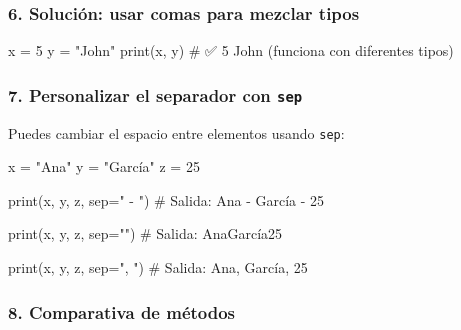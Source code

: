 \documentclass[
  doc,
  floatsintext,
  longtable,
  a4paper,
  nolmodern,
  notxfonts,
  notimes,
  12pt,
  colorlinks=true,linkcolor=blue,citecolor=blue,urlcolor=blue]{apa7}
\newenvironment{Shaded}{\begin{snugshade}}{\end{snugshade}}
\newcommand{\BuiltInTok}[1]{\textcolor[rgb]{0.00,0.23,0.31}{#1}}
\newcommand{\CommentTok}[1]{\textcolor[rgb]{0.37,0.37,0.37}{#1}}
\newcommand{\DecValTok}[1]{\textcolor[rgb]{0.68,0.00,0.00}{#1}}
\newcommand{\NormalTok}[1]{\textcolor[rgb]{0.00,0.23,0.31}{#1}}
\newcommand{\OperatorTok}[1]{\textcolor[rgb]{0.37,0.37,0.37}{#1}}
\newcommand{\StringTok}[1]{\textcolor[rgb]{0.13,0.47,0.30}{#1}}
\begin{document}
\subsubsection{6. Solución: usar comas para mezclar
tipos}\label{soluciuxf3n-usar-comas-para-mezclar-tipos}

\begin{Shaded}
\begin{Highlighting}[]
\NormalTok{x }\OperatorTok{=} \DecValTok{5}
\NormalTok{y }\OperatorTok{=} \StringTok{"John"}
\BuiltInTok{print}\NormalTok{(x, y)  }\CommentTok{\# ✅ 5 John (funciona con diferentes tipos)}
\end{Highlighting}
\end{Shaded}

\subsubsection{\texorpdfstring{7. Personalizar el separador con
\texttt{sep}}{7. Personalizar el separador con sep}}\label{personalizar-el-separador-con-sep}

Puedes cambiar el espacio entre elementos usando \texttt{sep}:

\begin{Shaded}
\begin{Highlighting}[]
\NormalTok{x }\OperatorTok{=} \StringTok{"Ana"}
\NormalTok{y }\OperatorTok{=} \StringTok{"García"}
\NormalTok{z }\OperatorTok{=} \DecValTok{25}

\BuiltInTok{print}\NormalTok{(x, y, z, sep}\OperatorTok{=}\StringTok{" {-} "}\NormalTok{)}
\CommentTok{\# Salida: Ana {-} García {-} 25}

\BuiltInTok{print}\NormalTok{(x, y, z, sep}\OperatorTok{=}\StringTok{""}\NormalTok{)}
\CommentTok{\# Salida: AnaGarcía25}

\BuiltInTok{print}\NormalTok{(x, y, z, sep}\OperatorTok{=}\StringTok{", "}\NormalTok{)}
\CommentTok{\# Salida: Ana, García, 25}
\end{Highlighting}
\end{Shaded}

\subsubsection{8. Comparativa de
métodos}\label{comparativa-de-muxe9todos}
\end{document}
